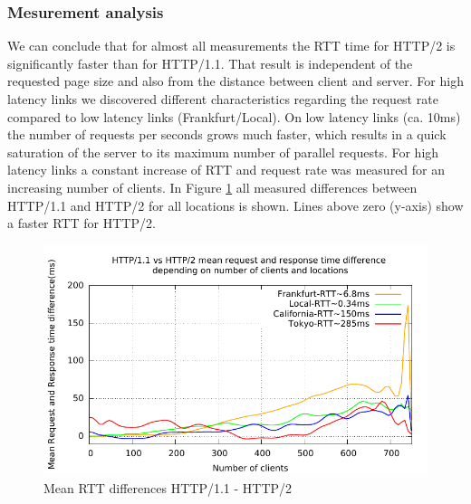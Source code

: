 \subsubsection{Mesurement analysis}

We can conclude that for almost all measurements the RTT time for HTTP/2 is significantly faster than for HTTP/1.1. That result is independent of the requested page size and also from the distance between client and server. For high latency links we discovered different characteristics regarding the request rate compared to low latency links (Frankfurt/Local). On low latency links (ca. 10ms) the number of requests per seconds grows much faster, which results in a quick saturation of the server to its maximum number of parallel requests. For high latency links a constant increase of RTT and request rate was measured for an increasing number of clients. In Figure \ref{fig:latency-all} all measured differences between HTTP/1.1 and HTTP/2 for all locations is shown. Lines above zero (y-axis) show a faster RTT for HTTP/2.

\begin{figure}[H]
	\centering
	\includegraphics[scale=1,trim=0.0cm .0cm .0cm .0cm,clip]{images/difflatency.pdf}
	\caption{Mean RTT differences HTTP/1.1 - HTTP/2}
	\label{fig:latency-all}
\end{figure}

